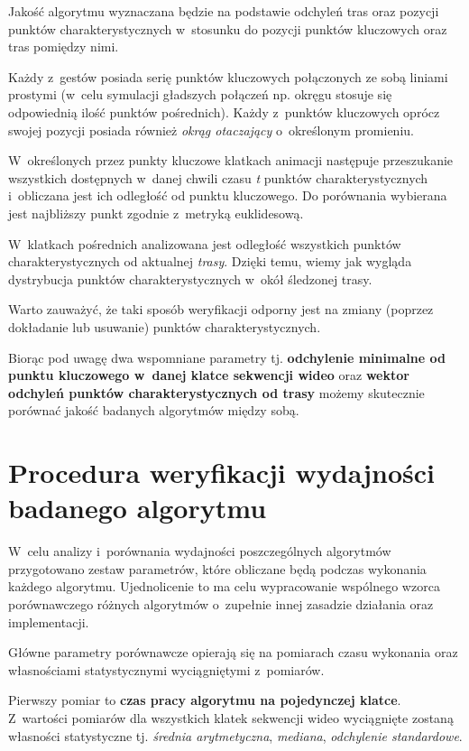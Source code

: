     Jakość algorytmu wyznaczana będzie na podstawie odchyleń tras oraz pozycji punktów charakterystycznych w~stosunku do pozycji punktów kluczowych oraz tras pomiędzy nimi.

    Każdy z~gestów posiada serię punktów kluczowych połączonych ze sobą liniami prostymi (w~celu symulacji gładszych połączeń np. okręgu stosuje się odpowiednią ilość punktów pośrednich). Każdy z~punktów kluczowych oprócz swojej pozycji posiada również \textit{okrąg otaczający} o~określonym promieniu.

    W~określonych przez punkty kluczowe klatkach animacji następuje przeszukanie wszystkich dostępnych w~danej chwili czasu \textit{t} punktów charakterystycznych i~obliczana jest ich odległość od punktu kluczowego. Do porównania wybierana jest najbliższy punkt zgodnie z~metryką euklidesową.

    W~klatkach pośrednich analizowana jest odległość wszystkich punktów charakterystycznych od aktualnej \textit{trasy}. Dzięki temu, wiemy jak wygląda dystrybucja punktów charakterystycznych w~okół śledzonej trasy.

    Warto zauważyć, że taki sposób weryfikacji odporny jest na zmiany (poprzez dokładanie lub usuwanie) punktów charakterystycznych.

    Biorąc pod uwagę dwa wspomniane parametry tj. \textbf{odchylenie minimalne od punktu kluczowego w~danej klatce sekwencji wideo} oraz \textbf{wektor odchyleń punktów charakterystycznych od trasy} możemy skutecznie porównać jakość badanych algorytmów między sobą.

  \section{Procedura weryfikacji wydajności badanego algorytmu}\label{Section_Wydajnosc}

    W~celu analizy i~porównania wydajności poszczególnych algorytmów przygotowano zestaw parametrów, które obliczane będą podczas wykonania każdego algorytmu. Ujednolicenie to ma celu wypracowanie wspólnego wzorca porównawczego różnych algorytmów o~zupełnie innej zasadzie działania oraz implementacji.

    Główne parametry porównawcze opierają się na pomiarach czasu wykonania oraz własnościami statystycznymi wyciągniętymi z~pomiarów.

    Pierwszy pomiar to \textbf{czas pracy algorytmu na pojedynczej klatce}. Z~wartości pomiarów dla wszystkich klatek sekwencji wideo wyciągnięte zostaną własności statystyczne tj. \textit{średnia arytmetyczna}, \textit{mediana}, \textit{odchylenie standardowe}.

